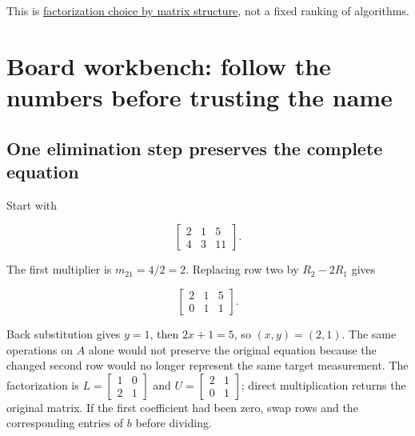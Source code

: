 This is \hyperref[02-foundations-ii-ch038-choose-a-factorization-from-structure-and-the-requested-answer]{factorization choice by matrix structure}, not a fixed ranking of algorithms.

\section{Board workbench: follow the numbers before trusting the name}\label{02-foundations-ii-ch038-board-workbench-follow-the-numbers-before-trusting-the-name}

\hypertarget{02-foundations-ii-ch038-board-workbench-follow-the-numbers-before-trusting-the-name}{}

\subsection{One elimination step preserves the complete equation}\label{02-foundations-ii-ch038-one-elimination-step-preserves-the-complete-equation}

\hypertarget{02-foundations-ii-ch038-one-elimination-step-preserves-the-complete-equation}{}

Start with

\[
\left[\begin{array}{cc|c}2&1&5\\4&3&11\end{array}\right].
\]

The first multiplier is \(m_{21}=4/2=2\). Replacing row two by \(R_2-2R_1\) gives

\[
\left[\begin{array}{cc|c}2&1&5\\0&1&1\end{array}\right].
\]

Back substitution gives \(y=1\), then \(2x+1=5\), so \((x,y)=(2,1)\). The same operations on \(A\) alone would not preserve the original equation because the changed second row would no longer represent the same target measurement. The factorization is \(L=\begin{bmatrix}1&0\\2&1\end{bmatrix}\) and \(U=\begin{bmatrix}2&1\\0&1\end{bmatrix}\); direct multiplication returns the original matrix. If the first coefficient had been zero, swap rows and the corresponding entries of \(b\) before dividing.

